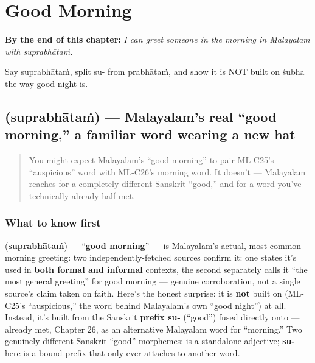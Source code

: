 
\chapter{Good Morning}
\label{ch:ml-good-morning}

\begin{chapteropening}
\textbf{By the end of this chapter:} \emph{I can greet someone in the morning in Malayalam with suprabhātaṁ.}

Say suprabhātaṁ, split su- from prabhātaṁ, and show it is NOT built on śubha the way good night is.
\end{chapteropening}

\section[\texorpdfstring{\ml{സുപ്രഭാതം} (suprabhātaṁ)}{സുപ്രഭാതം (suprabhātaṁ)}]{ (suprabhātaṁ) — Malayalam's real \textquotedblleft{}good morning,\textquotedblright{} a familiar word wearing a new hat}

\label{lesson:ML-C29-suprabhaatham}



\begin{quote}
You might expect Malayalam's \textquotedblleft{}good morning\textquotedblright{} to pair ML-C25's \textquotedblleft{}auspicious\textquotedblright{} word with ML-C26's morning word. It doesn't — Malayalam reaches for a completely different Sanskrit \textquotedblleft{}good,\textquotedblright{} and for a word you've technically already half-met.
\end{quote}

\subsection*{What to know first}
\textbf{} (\textbf{suprabhātaṁ}) — \textquotedblleft{}\textbf{good morning}\textquotedblright{} — is Malayalam's actual, most common morning greeting: two independently-fetched sources confirm it: one states it's used in \textbf{both formal and informal} contexts, the second separately calls it \textquotedblleft{}the most general greeting\textquotedblright{} for good morning — genuine corroboration, not a single source's claim taken on faith. Here's the honest surprise: it is \textbf{not} built on \textbf{} (ML-C25's \textquotedblleft{}auspicious,\textquotedblright{} the word behind Malayalam's own \textquotedblleft{}good night\textquotedblright{}) at all. Instead, it's built from the Sanskrit \textbf{prefix su-} (\textquotedblleft{}good\textquotedblright{}) fused directly onto \textbf{} — already met, Chapter 26, as an alternative Malayalam word for \textquotedblleft{}morning.\textquotedblright{} Two genuinely different Sanskrit \textquotedblleft{}good\textquotedblright{} morphemes: \textbf{} is a standalone adjective; \textbf{su-} here is a bound prefix that only ever attaches to another word.

